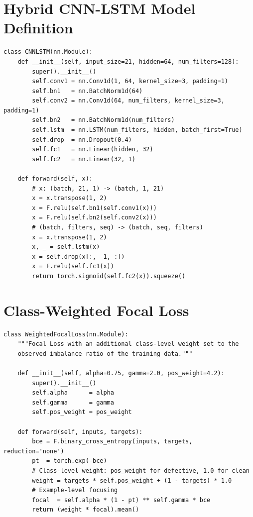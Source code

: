 \documentclass[12pt,a4paper,oneside]{report}
\begin{document}
\section{Hybrid CNN-LSTM Model Definition}

\begin{lstlisting}[caption={Hybrid CNN-LSTM architecture implemented in PyTorch},label={lst:cnnlstm}]
class CNNLSTM(nn.Module):
    def __init__(self, input_size=21, hidden=64, num_filters=128):
        super().__init__()
        self.conv1 = nn.Conv1d(1, 64, kernel_size=3, padding=1)
        self.bn1   = nn.BatchNorm1d(64)
        self.conv2 = nn.Conv1d(64, num_filters, kernel_size=3, padding=1)
        self.bn2   = nn.BatchNorm1d(num_filters)
        self.lstm  = nn.LSTM(num_filters, hidden, batch_first=True)
        self.drop  = nn.Dropout(0.4)
        self.fc1   = nn.Linear(hidden, 32)
        self.fc2   = nn.Linear(32, 1)

    def forward(self, x):
        # x: (batch, 21, 1) -> (batch, 1, 21)
        x = x.transpose(1, 2)
        x = F.relu(self.bn1(self.conv1(x)))
        x = F.relu(self.bn2(self.conv2(x)))
        # (batch, filters, seq) -> (batch, seq, filters)
        x = x.transpose(1, 2)
        x, _ = self.lstm(x)
        x = self.drop(x[:, -1, :])
        x = F.relu(self.fc1(x))
        return torch.sigmoid(self.fc2(x)).squeeze()
\end{lstlisting}

\section{Class-Weighted Focal Loss}

\begin{lstlisting}[caption={Class-Weighted Focal Loss, the primary contribution of this study},label={lst:cwfl}]
class WeightedFocalLoss(nn.Module):
    """Focal Loss with an additional class-level weight set to the
    observed imbalance ratio of the training data."""

    def __init__(self, alpha=0.75, gamma=2.0, pos_weight=4.2):
        super().__init__()
        self.alpha      = alpha
        self.gamma      = gamma
        self.pos_weight = pos_weight

    def forward(self, inputs, targets):
        bce = F.binary_cross_entropy(inputs, targets, reduction='none')
        pt  = torch.exp(-bce)
        # Class-level weight: pos_weight for defective, 1.0 for clean
        weight = targets * self.pos_weight + (1 - targets) * 1.0
        # Example-level focusing
        focal  = self.alpha * (1 - pt) ** self.gamma * bce
        return (weight * focal).mean()
\end{lstlisting}
\end{document}
